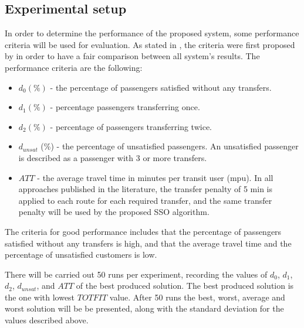 \subsection{Experimental setup}
\label{subsec:performanceComparison_setup}
In order to determine the performance of the proposed system, some performance criteria will be used for evaluation. As stated in \citet{kechagiopoulos14}, the criteria were first proposed by \citet{chakroborty02} in order to have a fair comparison between all system's results. The performance criteria are %
the following:
\begin{itemize}
\item $d_0 (\%)$ - the percentage of passengers satisfied without any transfers. 
\item $d_1 (\%)$ - percentage passengers transferring once. 
\item $d_2 (\%)$ - percentage of passengers transferring twice. 
\item $d_{unsat}$ (\%) - the percentage of unsatisfied passengers. An unsatisfied passenger is described as a passenger with 3 or more transfers. 
\item $ATT$  - the average travel time in minutes per transit user (mpu). In all approaches published in the literature, the transfer penalty of 5 min is applied to each route for each required transfer, and the same transfer penalty will be used by the proposed SSO algorithm.
\end{itemize}
The criteria for good performance includes that the percentage of passengers satisfied without any transfers is high, and that the average travel time and the percentage of unsatisfied customers is low. 



There will be carried out 50 runs per experiment, recording the values of $d_0$, $d_1$, $d_2$, $d_{unsat}$, and $ATT$ of the best produced solution. The best produced solution is the one with lowest $TOTFIT$ value. After 50 runs the best, worst, average and worst solution will be be presented, along with the standard deviation for the values described above. %

